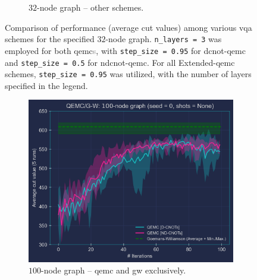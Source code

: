 \begin{figure}[hb!]
\begin{subfigure}[b]{0.495\textwidth}
        \caption{$32$-node graph – other schemes.}
        \label{fig:32-node_Graph}
    \end{subfigure}
    \caption{Comparison of performance (average cut values) among various \acrshort{vqa} schemes for the specified $32$-node graph. \texttt{n\_layers = 3} was employed for both \acrshort{qemc}\textcolor{gray}{s}, with \texttt{step\_size = 0.95} for \acrshort{dcnot}-\acrshort{qemc} and \texttt{step\_size = 0.5} for \acrshort{ndcnot}-\acrshort{qemc}. For all Extended-\acrshort{qemc} schemes, \texttt{step\_size = 0.95} was utilized, with the number of layers specified in the legend.}
    \label{fig:32-node_Graph(2-Subfigures)}
\end{figure}

\clearpage

\begin{figure}[hb!]
    \centering
    \begin{subfigure}[b]{0.495\textwidth}
        \centering
        \includegraphics[width=1\textwidth, height=0.812\textwidth]{Figures/Chapter_5/Large graphs/100-node_Graph(QEMC&G-W)_seed=0.png}
        \caption{$100$-node graph – \acrshort{qemc} and \acrshort{gw} exclusively.}
        \label{fig:100-node_Graph(QEMC&G-W)}
    \end{subfigure}
    \hfill
    \begin{subfigure}[b]{0.495\textwidth}
        \centering

\end{subfigure}
\end{figure}
